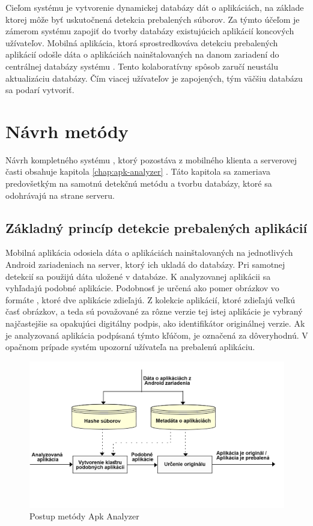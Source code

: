 Cieľom systému  je vytvorenie dynamickej databázy dát o aplikáciách, na základe ktorej môže byť uskutočnená detekcia prebalených súborov.
Za týmto účeľom je zámerom systému  zapojiť do tvorby databázy existujúcich aplikácií koncových užívateľov. Mobilná aplikácia, ktorá sprostredkováva detekciu prebalených aplikácií odošle dáta o aplikáciách nainštalovaných na danom zariadení do centrálnej databázy systému . Tento kolaboratívny spôsob zaručí neustálu aktualizáciu databázy. Čím viacej užívateľov je zapojených, tým väčšiu databázu sa podarí vytvoriť.

\section{Návrh metódy}
Návrh kompletného systému , ktorý pozostáva z mobilného klienta a serverovej časti obsahuje kapitola \ref{chap:apk-analyzer} . Táto kapitola sa zameriava predovšetkým na samotnú detekčnú metódu a tvorbu databázy, ktoré sa odohrávajú na strane serveru.

\subsection{Základný princíp detekcie prebalených aplikácií}
Mobilná aplikácia  odosiela dáta o aplikáciách nainštalovaných na jednotlivých Android zariadeniach na server, ktorý ich ukladá do databázy. Pri samotnej detekcií sa použijú dáta uložené v databáze. K analyzovanej aplikácii sa vyhľadajú podobné aplikácie. Podobnosť je určená ako pomer obrázkov vo formáte , ktoré dve aplikácie zdieľajú. Z kolekcie aplikácií, ktoré zdieľajú veľkú časť obrázkov, a teda sú považované za rôzne verzie tej istej aplikácie je vybraný najčastejšie sa opakujúci digitálny podpis, ako identifikátor originálnej verzie. Ak je analyzovaná aplikácia podpísaná týmto kľúčom, je označená za dôveryhodnú. V opačnom prípade systém upozorní užívateľa na prebalenú aplikáciu. 

\begin{figure}[htb]
  \begin{center}
    \includegraphics[width=130mm]{images/detection-overview.png}
  \end{center}
  \caption{Postup metódy Apk Analyzer}
  \label{fig:metódaApkAnalyzer}
\end{figure}


